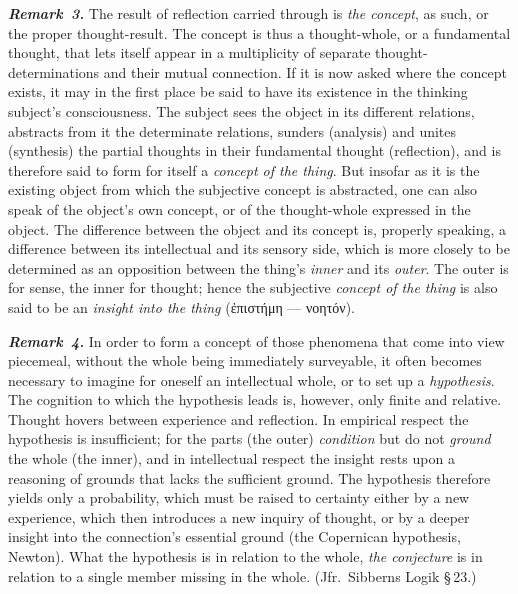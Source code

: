 \documentclass[12pt]{book}
\newcommand{\anm}[1]{\emph{\textbf{Remark~#1.}}}
\begin{document}
\anm{3} The result of reflection carried through is \emph{the concept}, as
such, or the proper thought-result. The concept is thus a thought-whole, or
a fundamental thought, that lets itself appear in a multiplicity of separate
thought-determinations and their mutual connection. If it is now asked where
the concept exists, it may in the first place be said to have its existence
in the thinking subject's consciousness. The subject sees the object in its
different relations, abstracts from it the determinate relations, sunders
(analysis) and unites (synthesis) the partial thoughts in their fundamental
thought (reflection), and is therefore said to form for itself a
\emph{concept of the thing}. But insofar as it is the existing object from
which the subjective concept is abstracted, one can also speak of the
object's own concept, or of the thought-whole expressed in the object. The
difference between the object and its concept is, properly speaking, a
difference between its intellectual and its sensory side, which is more
closely to be determined as an opposition between the thing's \emph{inner}
and its \emph{outer}. The outer is for sense, the inner for thought; hence
the subjective \emph{concept of the thing} is also said to be an
\emph{insight into the thing} (ἐπιστήμη --- νοητόν).

\anm{4} In order to form a concept of those phenomena that come into view
piecemeal, without the whole being immediately surveyable, it often becomes
necessary to imagine for oneself an intellectual whole, or to set up a
\emph{hypothesis}. The cognition to which the hypothesis leads is, however,
only finite and relative. Thought hovers between experience and reflection.
In empirical respect the hypothesis is insufficient; for the parts (the
outer) \emph{condition} but do not \emph{ground} the whole (the inner), and
in intellectual respect the insight rests upon a reasoning of grounds that
lacks the sufficient ground. The hypothesis therefore yields only a
probability, which must be raised to certainty either by a new experience,
which then introduces a new inquiry of thought, or by a deeper insight into
the connection's essential ground (the Copernican hypothesis, Newton). What
the hypothesis is in relation to the whole, \emph{the conjecture} is in
relation to a single member missing in the whole. (Jfr.\ Sibberns Logik
\S\,23.)
\end{document}
